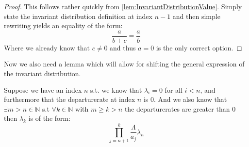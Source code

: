 \begin{proof}
  This follows rather quickly from \ref{lem:InvariantDistributionValue}. Simply state the invariant distribution
  definition at index $n-1$ and then simple rewriting yields an equality of the form:
  $$\frac{a}{b+c} = \frac{a}{b}$$
  Where we already know that $c\neq0$ and thus $a=0$ is the only correct option.
\end{proof}






Now we also need a lemma which will allow for shifting the general expression of the invariant distribution.
\begin{lemma}\label{lem:ShiftedInvariantDistributionValue}
  Suppose we have an index $n$ s.t. we know that $\lambda_i = 0$ for all $i < n$, and furthermore
  that the departurerate at index $n$ is $0$. And we also know that $\exists m > n \in \mathbb{N}$ s.t
  $\forall k \in \mathbb{N}$ with $m \geq k > n$
  the departurerates are greater than $0$ then $\lambda_k$ is of the form:
  $$\prod_{j={n+1}}^k \frac{\Lambda}{a_j} \lambda_n$$
\end{lemma}

